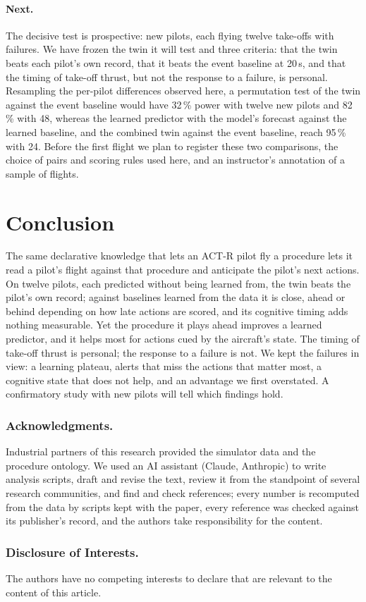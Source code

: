 \documentclass{llncs}
\begin{document}
\paragraph{Next.} The decisive test is prospective: new pilots, each flying twelve take-offs with failures. We have frozen the twin it
will test and three criteria: that the twin beats each pilot's own record, that it beats the event baseline at 20\,s, and that the timing
of take-off thrust, but not the response to a failure, is personal. Resampling the per-pilot differences observed here, a permutation
test of the twin against the event baseline would have 32\,\% power with twelve new pilots and 82\,\% with 48, whereas the learned
predictor with the model's forecast against the learned baseline, and the combined twin against the event baseline, reach 95\,\% with
24. Before the first flight we plan to register these two comparisons, the choice of pairs and scoring rules used here, and an
instructor's annotation of a sample of flights.

\section{Conclusion}

The same declarative knowledge that lets an ACT-R pilot fly a procedure lets it read a pilot's flight against that procedure and
anticipate the pilot's next actions. On twelve pilots, each predicted without being learned from, the twin beats the pilot's own record;
against baselines learned from the data it is close, ahead or behind depending on how late actions are scored, and its cognitive timing
adds nothing measurable. Yet the procedure it plays ahead improves a learned predictor, and it helps most for actions cued by the
aircraft's state. The timing of take-off thrust is personal; the response
to a failure is not. We kept the failures in view: a learning plateau, alerts that miss the actions that matter most, a cognitive state
that does not help, and an advantage we first overstated. A confirmatory study with new pilots will tell which findings hold.

\subsubsection*{Acknowledgments.} Industrial partners of this research provided the simulator data and the procedure ontology. We used
an AI assistant (Claude, Anthropic) to write analysis scripts, draft and revise the text, review it from the standpoint of several
research communities, and find and check references; every number is recomputed from the data by scripts kept with the paper, every
reference was checked against its publisher's record, and the authors take responsibility for the content.

\subsubsection*{Disclosure of Interests.} The authors have no competing interests to declare that are relevant to the content of this
article.



\end{document}
